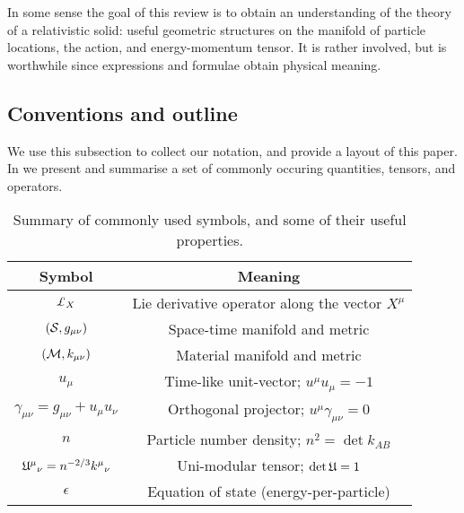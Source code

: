 In some sense the  goal of this review is to obtain an understanding of the theory of a relativistic solid: useful geometric structures on the manifold of particle locations, the action, and energy-momentum tensor. It is rather involved, but is worthwhile since expressions and formulae obtain physical meaning.

\subsection{Conventions and outline}
We use this subsection to collect our notation, and provide a layout of this paper. In  we present and summarise  a set of commonly occuring quantities, tensors, and operators. 
{\renewcommand{\arraystretch}{1.4}
\begin{table}%
\begin{center}
\begin{tabular}{||c |  c ||}
\hline
\textbf{Symbol} & \textbf{Meaning} \\
\hline
$\lied{X}$ & Lie derivative operator along the vector $X^{\mu}$\\\hline
$\left(\mathcal{S}, g_{\mu\nu}\right)$ & Space-time manifold and metric\\\hline
$\left(\mathcal{M}, k_{\mu\nu}\right)$ & Material manifold and metric \\\hline
$u_{\mu}$ & Time-like unit-vector; $u^{\mu}u_{\mu} = -1$\\\hline
$\gamma_{\mu\nu} = g_{\mu\nu} + u_{\mu}u_{\nu}$ & Orthogonal projector; $u^{\mu}\gamma_{\mu\nu}=0$\\\hline
$n$ & Particle number density; $n^2 = \det k_{ AB} $\\\hline
${\mathfrak{U}^{\mu}}_{\nu} = n^{-2/3}{k^{\mu}}_{\nu}$ & Uni-modular tensor; $\det \mathfrak{U} = 1$\\\hline
$\epsilon$ & Equation of state (energy-per-particle)
\\\hline
\end{tabular}\caption{Summary of commonly used symbols, and some of their useful properties.}\label{tab:common}
\end{center}
\end{table}
}

